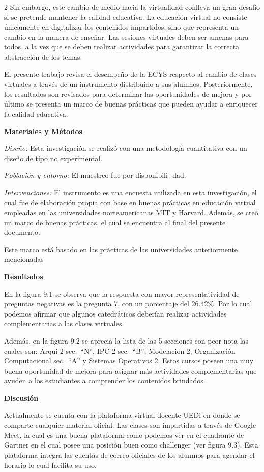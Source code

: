 \documentclass[12pt,spanish,Letterpaper,openany]{book}
\begin{document}
\begin {multicols}{2}
Sin embargo, este cambio de medio hacia la virtualidad conlleva un gran desafío si se pretende mantener la calidad educativa. La educación virtual no consiste únicamente en digitalizar los contenidos impartidos, sino que representa un cambio en la manera de enseñar. Las sesiones virtuales deben ser amenas para todos, a la vez que se deben realizar actividades para garantizar la correcta abstracción de los temas.

El presente trabajo revisa el desempeño de la ECYS respecto al cambio de clases virtuales a través de un instrumento distribuido a sus alumnos. Posteriormente, los resultados son revisados para determinar las oportunidades de mejora y por último se presenta un marco de buenas prácticas que pueden ayudar a enriquecer la calidad educativa.

\textbf{Materiales y Métodos}

\emph{Diseño:} Esta investigación se realizó con una metodología cuantitativa con un diseño de tipo no experimental.

\emph{Población y entorno:} El muestreo fue por disponibili-
dad.

\emph{Intervenciones:} El instrumento es una encuesta utilizada en esta investigación, el cual fue de elaboración propia con base en buenas prácticas en educación virtual empleadas en las universidades norteamericanas MIT y Harvard. Además, se creó un marco de buenas prácticas, el cual se encuentra al final del presente documento.

Este marco está basado en las prácticas de las universidades anteriormente mencionadas

\textbf{Resultados}

En la figura 9.1 se observa que la respuesta con mayor representatividad de preguntas negativas es la pregunta 7, con un porcentaje del 26.42\%. Por lo cual podemos afirmar que algunos catedráticos deberían realizar actividades complementarias a las clases virtuales.

Además, en la figura 9.2 se aprecia la lista de las 5 secciones con peor nota las cuales son: Arqui 2 sec.~``N'', IPC 2 sec.~``B'', Modelación 2, Organización Computacional sec.~``A'' y Sistemas Operativos 2. Estos cursos poseen una muy buena oportunidad de mejora para asignar más actividades complementarias que ayuden a los estudiantes a comprender los contenidos brindados.

\textbf{Discusión}

Actualmente se cuenta con la plataforma virtual docente UEDi en donde se comparte cualquier material oficial. Las clases son impartidas a través de Google Meet, la cual es una buena plataforma como podemos ver en el cuadrante de Gartner en el cual posee una posición buen como challenger (ver figura 9.3). Esta plataforma integra las cuentas de correo oficiales de los alumnos para agendar el horario lo cual facilita su uso.


\end{multicols}
\end{document}
